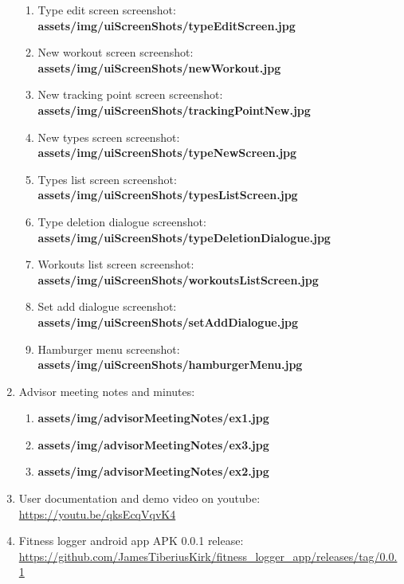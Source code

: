 \documentclass{article}
\begin{document}
\begin{multicols}{2}
\begin{enumerate}
\begin{enumerate}
      \item Type edit screen screenshot: \textbf{assets/img/uiScreenShots/typeEditScreen.jpg}\\
      \item New workout screen screenshot: \textbf{assets/img/uiScreenShots/newWorkout.jpg}\\
      \item New tracking point screen screenshot: \textbf{assets/img/uiScreenShots/trackingPointNew.jpg}\\
      \item New types screen screenshot: \textbf{assets/img/uiScreenShots/typeNewScreen.jpg}\\
      \item Types list screen screenshot: \textbf{assets/img/uiScreenShots/typesListScreen.jpg}\\
      \item Type deletion dialogue screenshot: \textbf{assets/img/uiScreenShots/typeDeletionDialogue.jpg}\\
      \item Workouts list screen screenshot: \textbf{assets/img/uiScreenShots/workoutsListScreen.jpg}\\
      \item Set add dialogue screenshot: \textbf{assets/img/uiScreenShots/setAddDialogue.jpg}\\
      \item Hamburger menu screenshot: \textbf{assets/img/uiScreenShots/hamburgerMenu.jpg}\\
    \end{enumerate}
  \item Advisor meeting notes and minutes:
    \begin{enumerate}
      \item \textbf{assets/img/advisorMeetingNotes/ex1.jpg}\\
      \item \textbf{assets/img/advisorMeetingNotes/ex3.jpg}\\
      \item \textbf{assets/img/advisorMeetingNotes/ex2.jpg}\\
    \end{enumerate}
  \item User documentation and demo video on youtube: \url{https://youtu.be/qksEcqVqvK4}\\
  \item Fitness logger android app APK 0.0.1 release: \url{https://github.com/JamesTiberiusKirk/fitness\_logger\_app/releases/tag/0.0.1}\\

\end{enumerate}
\end{multicols}
\end{document}
